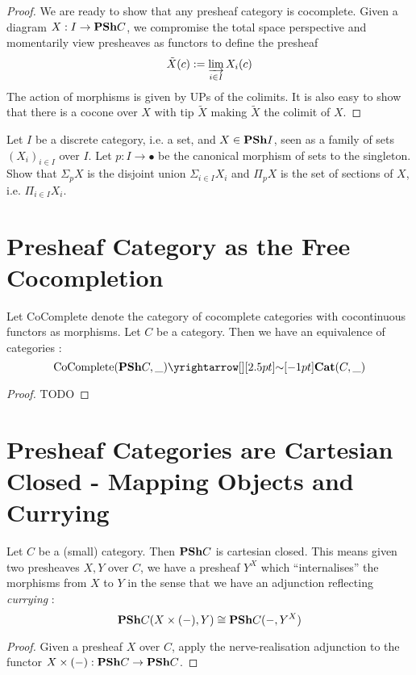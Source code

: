 \documentclass{article}
\begin{document}
\begin{proof}
  We are ready to show that any presheaf category is cocomplete.
  Given a diagram $X : I \to \mathbf{PSh} C$,
  we compromise the total space perspective and
  momentarily view presheaves as functors to define the presheaf
  \[
    \tilde{X}(c) := \varinjlim_{i \in I} X_i(c)
  \]
  The action of morphisms is given by UPs of the colimits.
  It is also easy to show that there is a cocone over $X$ with 
  tip $\tilde{X}$ making $\tilde{X}$ the colimit of $X$.
\end{proof}

\begin{eg}
  
  Let $I$ be a discrete category, i.e. a set,
  and $X \in \mathbf{PSh} I$, seen as a family of sets $(X_i)_{i \in I}$ over $I$.
  Let $p : I \to \bullet$ be the canonical morphism of sets to the singleton.
  Show that $\Sigma_p X$ is the disjoint union $\Sigma_{i \in I} X_i$
  and $\Pi_p X$ is the set of sections of $X$,
  i.e. $\Pi_{i \in I} X_i$.
\end{eg}

\section{Presheaf Category as the Free Cocompletion}

\begin{prop}
  
  Let $\mathrm{CoComplete}$ denote the category of
  cocomplete categories with cocontinuous functors as morphisms.
  Let $C$ be a category.
  Then we have an equivalence of categories : 
  \[
    \mathrm{CoComplete}(\PSH C , \_) \map{\sim}{}
    \mathbf{Cat}(C , \_)
  \]
\end{prop}
\begin{proof}
  TODO 
\end{proof}

\section{Presheaf Categories are Cartesian Closed - 
  Mapping Objects and Currying}

\begin{prop}

  Let $C$ be a (small) category.
  Then $\mathbf{PSh} C$ is cartesian closed. 
  This means given two presheaves $X, Y$ over $C$,
  we have a presheaf $Y^X$ which ``internalises'' 
  the morphisms from $X$ to $Y$ in the sense that we have
  an adjunction reflecting \emph{currying} : 
  \[
    \mathbf{PSh} C (X \times (-) , Y) \cong \mathbf{PSh} C ( - , Y^X)  
  \]
\end{prop}
\begin{proof}
  Given a presheaf $X$ over $ C$,
  apply the nerve-realisation adjunction to the functor
  $X \times (-) : \mathbf{PSh} C \to \mathbf{PSh} C$.
\end{proof}
\end{document}
